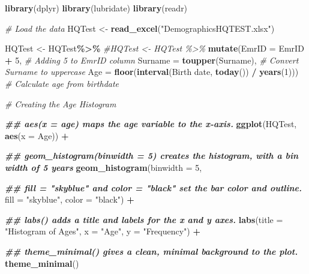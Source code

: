 \documentclass[
]{article}
\newenvironment{Shaded}{\begin{snugshade}}{\end{snugshade}}
\newcommand{\AttributeTok}[1]{\textcolor[rgb]{0.13,0.29,0.53}{#1}}
\newcommand{\CommentTok}[1]{\textcolor[rgb]{0.56,0.35,0.01}{\textit{#1}}}
\newcommand{\DecValTok}[1]{\textcolor[rgb]{0.00,0.00,0.81}{#1}}
\newcommand{\DocumentationTok}[1]{\textcolor[rgb]{0.56,0.35,0.01}{\textbf{\textit{#1}}}}
\newcommand{\FunctionTok}[1]{\textcolor[rgb]{0.13,0.29,0.53}{\textbf{#1}}}
\newcommand{\NormalTok}[1]{#1}
\newcommand{\OtherTok}[1]{\textcolor[rgb]{0.56,0.35,0.01}{#1}}
\newcommand{\SpecialCharTok}[1]{\textcolor[rgb]{0.81,0.36,0.00}{\textbf{#1}}}
\newcommand{\StringTok}[1]{\textcolor[rgb]{0.31,0.60,0.02}{#1}}
\begin{document}
\begin{Shaded}
\begin{Highlighting}[]
\FunctionTok{library}\NormalTok{(dplyr)}
\FunctionTok{library}\NormalTok{(lubridate)}
\FunctionTok{library}\NormalTok{(readr)}

\CommentTok{\# Load the data}
\NormalTok{HQTest }\OtherTok{\textless{}{-}} \FunctionTok{read\_excel}\NormalTok{(}\StringTok{"DemographicsHQTEST.xlsx"}\NormalTok{)}



\NormalTok{HQTest }\OtherTok{\textless{}{-}}\NormalTok{ HQTest}\SpecialCharTok{\%\textgreater{}\%}
  \CommentTok{\#HQTest \textless{}{-} HQTest \%\textgreater{}\%}
  \FunctionTok{mutate}\NormalTok{(}\AttributeTok{EmrID =}\NormalTok{ EmrID }\SpecialCharTok{+} \DecValTok{5}\NormalTok{,  }\CommentTok{\# Adding 5 to EmrID column}
         \AttributeTok{Surname =} \FunctionTok{toupper}\NormalTok{(Surname),  }\CommentTok{\# Convert Surname to uppercase}
         \AttributeTok{Age =} \FunctionTok{floor}\NormalTok{(}\FunctionTok{interval}\NormalTok{(}\StringTok{\textasciigrave{}}\AttributeTok{Birth date}\StringTok{\textasciigrave{}}\NormalTok{, }\FunctionTok{today}\NormalTok{()) }\SpecialCharTok{/} \FunctionTok{years}\NormalTok{(}\DecValTok{1}\NormalTok{)))  }\CommentTok{\# Calculate age from birthdate}
  


\CommentTok{\# Creating the Age Histogram}


\DocumentationTok{\#\#  aes(x = age) maps the age variable to the x{-}axis.}
\FunctionTok{ggplot}\NormalTok{(HQTest, }\FunctionTok{aes}\NormalTok{(}\AttributeTok{x =}\NormalTok{ Age)) }\SpecialCharTok{+} 
  
\DocumentationTok{\#\#  geom\_histogram(binwidth = 5) creates the histogram, with a bin width of 5 years }
\FunctionTok{geom\_histogram}\NormalTok{(}\AttributeTok{binwidth =} \DecValTok{5}\NormalTok{, }

\DocumentationTok{\#\#  fill = "skyblue" and color = "black" set the bar color and outline.}
\AttributeTok{fill =} \StringTok{"skyblue"}\NormalTok{, }\AttributeTok{color =} \StringTok{"black"}\NormalTok{) }\SpecialCharTok{+}
  
\DocumentationTok{\#\#  labs() adds a title and labels for the x and y axes.}
\FunctionTok{labs}\NormalTok{(}\AttributeTok{title =} \StringTok{"Histogram of Ages"}\NormalTok{, }\AttributeTok{x =} \StringTok{"Age"}\NormalTok{, }\AttributeTok{y =} \StringTok{"Frequency"}\NormalTok{) }\SpecialCharTok{+}
  
\DocumentationTok{\#\#  theme\_minimal() gives a clean, minimal background to the plot.  }
\FunctionTok{theme\_minimal}\NormalTok{()}
\end{Highlighting}
\end{Shaded}
\end{document}
